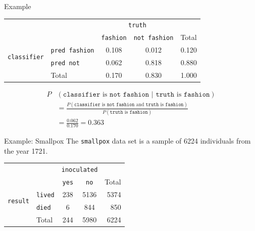 \begin{frame}{Example}
    \begin{center}
        \begin{tabular}{r l cc r}
		& & \multicolumn{2}{c}{{\texttt{truth}}} & \\
        \cline{3-4}
		& & \texttt{fashion} & \texttt{not fashion} & Total  \\ 
        \cline{2-5}
        \multirow{2}{*}{{\texttt{classifier}}} 
        & \texttt{pred fashion}   & 0.108 & 0.012 & 0.120 \\ 
  		& \texttt{pred not}       & 0.062 & 0.818 & 0.880 \\ 
        \cline{2-5}
  		& Total	& 0.170 & 0.830 & 1.000 \\
        \cline{2-5}
    \end{tabular}
    \end{center}
    \begin{align*}
    P&(\texttt{classifier} \text{ is } \texttt{not fashion } | \texttt{ truth} \text{ is } \texttt{fashion}) \\
    &= \frac{P(\texttt{classifier} \text{ is } \texttt{not fashion } \text{and} \texttt{ truth} \text{ is } \texttt{fashion})}{P(\texttt{truth} \text{ is } \texttt{fashion})} \\
    &= \frac{0.062}{0.170} = 0.363
    \end{align*}
\end{frame}

\begin{frame}{Example: Smallpox}
    The \texttt{smallpox} data set is a sample of 6224 individuals from the year 1721. 
    \begin{center}
        \begin{tabular}{r l cc r}
		& & \multicolumn{2}{c}{{\texttt{inoculated}}} & \\
        \cline{3-4}
		& & \texttt{yes} & \texttt{no} & Total  \\ 
        \cline{2-5}
        \multirow{2}{*}{{\texttt{result}}} 
        & \texttt{lived}    & 238 & 5136 & 5374 \\ 
  		& \texttt{died}     & 6 & 844 & 850 \\ 
        \cline{2-5}
  		& Total	            & 244 & 5980 & 6224 \\
        \cline{2-5}
    \end{tabular}
    \end{center}
\end{frame}

